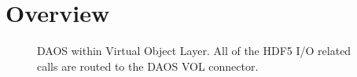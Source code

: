 \documentclass[../users_guide.tex]{subfiles}
\begin{document}
\section{Overview}

\begin{figure}
\centering

\caption{DAOS within Virtual Object Layer. All of the HDF5 I/O related calls are
routed to the DAOS VOL connector.}
\label{fig:vol}
\end{figure}
\end{document}
